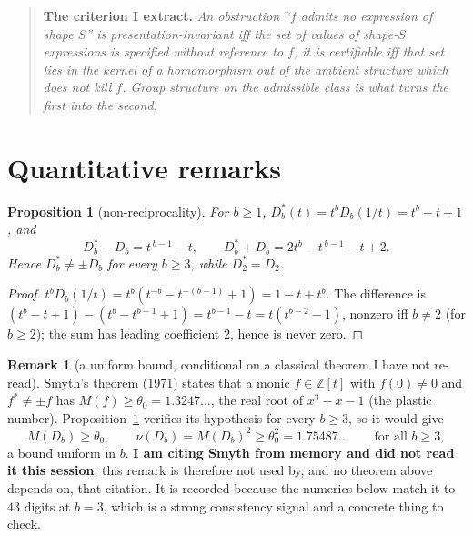 \documentclass[11pt]{article}
\newtheorem{proposition}[theorem]{Proposition}
\theoremstyle{definition}
\newtheorem{remark}[theorem]{Remark}
\newcommand{\ZZ}{\mathbb{Z}}
\begin{document}
\begin{quote}
\textbf{The criterion I extract.} \emph{An obstruction ``$f$ admits no expression of shape $S$''
is presentation-invariant iff the set of values of shape-$S$ expressions is specified without
reference to $f$; it is certifiable iff that set lies in the kernel of a homomorphism out of the
ambient structure which does not kill $f$. Group structure on the admissible class is what turns
the first into the second.}
\end{quote}

\section{Quantitative remarks}

\begin{proposition}[non-reciprocality]\label{prop:nonrecip}
For $b\ge1$, $D_b^{*}(t)=t^{b}D_b(1/t)=t^{b}-t+1$, and
\[
  D_b^{*}-D_b=t^{\,b-1}-t,\qquad D_b^{*}+D_b=2t^{b}-t^{\,b-1}-t+2 .
\]
Hence $D_b^{*}\ne\pm D_b$ for every $b\ge3$, while $D_2^{*}=D_2$.
\end{proposition}

\begin{proof}
$t^{b}D_b(1/t)=t^{b}(t^{-b}-t^{-(b-1)}+1)=1-t+t^{b}$. The difference is
$(t^{b}-t+1)-(t^{b}-t^{b-1}+1)=t^{b-1}-t=t(t^{b-2}-1)$, nonzero iff $b\ne2$ (for $b\ge2$); the
sum has leading coefficient $2$, hence is never zero.
\end{proof}

\begin{remark}[a uniform bound, conditional on a classical theorem I have not re-read]
\label{rem:smyth}
Smyth's theorem (1971) states that a monic $f\in\ZZ[t]$ with $f(0)\ne0$ and $f^{*}\ne\pm f$ has
$M(f)\ge\theta_0=1.3247\ldots$, the real root of $x^{3}-x-1$ (the plastic number).
Proposition~\ref{prop:nonrecip} verifies its hypothesis for every $b\ge3$, so it would give
\[
  M(D_b)\ge\theta_0,\qquad \nu(D_b)=M(D_b)^{2}\ge\theta_0^{2}=1.75487\ldots
  \qquad\text{for all } b\ge3,
\]
a bound uniform in $b$. \textbf{I am citing Smyth from memory and did not read it this session};
this remark is therefore not used by, and no theorem above depends on, that citation. It is
recorded because the numerics below match it to $43$ digits at $b=3$, which is a strong
consistency signal and a concrete thing to check.
\end{remark}
\end{document}
